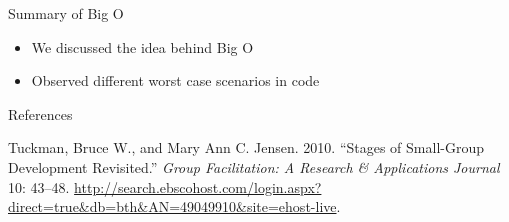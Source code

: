 \begin{frame}{Summary of Big O}

\begin{itemize}
\tightlist
\item
  We discussed the idea behind Big O
\item
  Observed different worst case scenarios in code
\end{itemize}

\end{frame}

\begin{frame}{References}

\hypertarget{refs}{}
\hypertarget{ref-2010tuckmangroup}{}
Tuckman, Bruce W., and Mary Ann C. Jensen. 2010. ``Stages of Small-Group
Development Revisited.'' \emph{Group Facilitation: A Research \&
Applications Journal} 10: 43--48.
\url{http://search.ebscohost.com/login.aspx?direct=true\&db=bth\&AN=49049910\&site=ehost-live}.

\end{frame}

